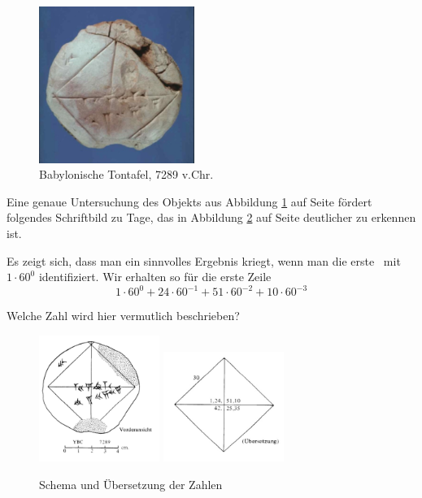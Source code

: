 \documentclass[%
11pt,%
twoside,%
titlepage,%
german,%
]{scrartcl}
\begin{document}
\begin{figure}
\begin{center}
\includegraphics[width=0.45\textwidth]{pictures/tontafel}
\end{center}
\caption{Babylonische Tontafel, 7289 v.Chr.}\label{abb:tontafel}
\end{figure}

Eine genaue Untersuchung des Objekts aus Abbildung \ref{abb:tontafel} auf Seite \pageref{abb:tontafel} f\"ordert folgendes Schriftbild zu Tage, das in Abbildung \ref{interpretation} auf Seite \pageref{interpretation} deutlicher zu erkennen ist.

Es zeigt sich, dass man ein sinnvolles Ergebnis kriegt, wenn man die erste \grqq\ mit $1\cdot60^0$ identifiziert. Wir erhalten so f\"ur die erste Zeile
$$1\cdot60^0+24\cdot60^{-1}+51\cdot60^{-2}+10\cdot60^{-3}$$
\begin{ueb}[irrational]
Welche Zahl wird hier vermutlich beschrieben?
\end{ueb}

\begin{figure}
\begin{center}
\includegraphics[width=0.35\textwidth]{pictures/tontafelschema}
\includegraphics[width=0.35\textwidth]{pictures/schema}
\end{center}
\caption{Schema und \"Ubersetzung der Zahlen}\label{interpretation}
\end{figure}
\end{document}
